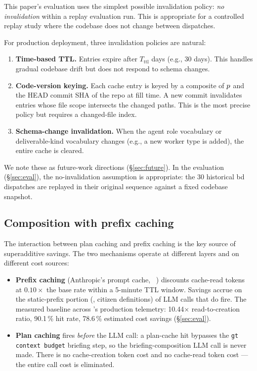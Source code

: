 This paper's evaluation uses the simplest possible invalidation policy:
\emph{no invalidation} within a replay evaluation run.  This is
appropriate for a controlled replay study where the codebase does not
change between dispatches.

For production deployment, three invalidation policies are natural:

\begin{enumerate}[noitemsep]
  \item \textbf{Time-based TTL.} Entries expire after \(T_{\text{ttl}}\)
    days (e.g., 30 days).  This handles gradual codebase drift but
    does not respond to schema changes.
  \item \textbf{Code-version keying.} Each cache entry is keyed by a
    composite of \(p\) and the HEAD commit SHA of the repo at fill
    time.  A new commit invalidates entries whose file scope intersects
    the changed paths.  This is the most precise policy but requires a
    changed-file index.
  \item \textbf{Schema-change invalidation.} When the agent role
    vocabulary or deliverable-kind vocabulary changes (e.g., a new
    worker type is added), the entire cache is cleared.
\end{enumerate}

We note these as future-work directions (§\ref{sec:future}).  In the
evaluation (§\ref{sec:eval}), the no-invalidation assumption is
appropriate: the 30 historical bd dispatches are replayed in their
original sequence against a fixed codebase snapshot.

\subsection{Composition with prefix caching}

The interaction between plan caching and prefix caching is the key
source of superadditive savings.  The two mechanisms operate at
different layers and on different cost sources:

\begin{itemize}[noitemsep]
  \item \textbf{Prefix caching} (Anthropic's prompt cache,
    ~\cite{anthropic-cache}) discounts cache-read tokens at \(0.10\times\)
    the base rate within a 5-minute TTL window.  Savings accrue on the
    static-prefix portion (\claudemd, citizen definitions) of LLM
    calls that do fire.  The measured baseline across
    \blackrim's production telemetry: 10.44\(\times\) read-to-creation
    ratio, 90.1\,\% hit rate, 78.6\,\% estimated cost savings
    (§\ref{sec:eval}).
  \item \textbf{Plan caching} fires \emph{before} the LLM call:
    a plan-cache hit bypasses the \texttt{gt context budget} briefing
    step, so the briefing-composition LLM call is never made.  There
    is no cache-creation token cost and no cache-read token cost ---
    the entire call cost is eliminated.
\end{itemize}

